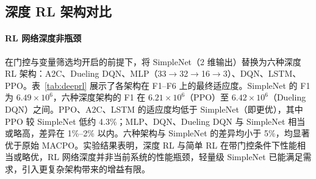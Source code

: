 \documentclass[12pt]{ctexart}
\begin{document}
\subsection{深度 RL 架构对比}

\paragraph{RL 网络深度非瓶颈} 在门控与变量筛选均开启的前提下，将 SimpleNet（2 维输出）替换为六种深度 RL 架构：A2C、Dueling DQN、MLP（33\(\to\)32\(\to\)16\(\to\)3）、DQN、LSTM、PPO。表~\ref{tab:deeprl} 展示了各架构在 F1--F6 上的最终适应度。SimpleNet 的 F1 为 \(6.49 \times 10^6\)，六种深度架构的 F1 在 \(6.21 \times 10^6\)（PPO）至 \(6.42 \times 10^6\)（Dueling DQN）之间。PPO、A2C、LSTM 的适应度均低于 SimpleNet（即更优），其中 PPO 较 SimpleNet 低约 4.3\%；MLP、DQN、Dueling DQN 与 SimpleNet 相当或略高，差异在 1\%--2\% 以内。六种架构与 SimpleNet 的差异均小于 5\%，均显著优于原始 MACPO。实验结果表明，深度 RL 与简单 RL 在带门控条件下性能相当或略优，RL 网络深度并非当前系统的性能瓶颈，轻量级 SimpleNet 已能满足需求，引入更复杂架构带来的增益有限。
\end{document}

